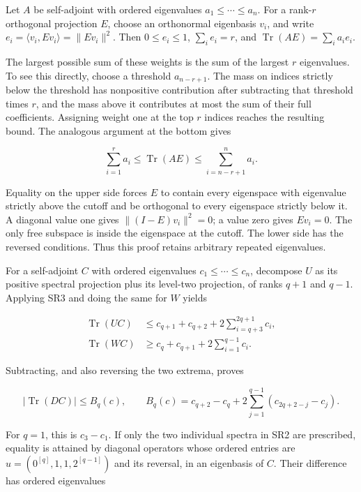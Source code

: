 Let \(A\) be self-adjoint with ordered eigenvalues \(a_1\le\cdots\le a_n\). For a rank-\(r\) orthogonal projection \(E\), choose an orthonormal eigenbasis \(v_i\), and write \(e_i=\langle v_i,Ev_i\rangle=\|Ev_i\|^2\). Then \(0\le e_i\le1\), \(\sum_i e_i=r\), and \(\operatorname{Tr}(AE)=\sum_i a_ie_i\).

The largest possible sum of these weights is the sum of the largest \(r\) eigenvalues. To see this directly, choose a threshold \(a_{n-r+1}\). The mass on indices strictly below the threshold has nonpositive contribution after subtracting that threshold times \(r\), and the mass above it contributes at most the sum of their full coefficients. Assigning weight one at the top \(r\) indices reaches the resulting bound. The analogous argument at the bottom gives

\[
\sum_{i=1}^{r}a_i\le\operatorname{Tr}(AE)
\le\sum_{i=n-r+1}^{n}a_i.
\tag{SR3}
\]

Equality on the upper side forces \(E\) to contain every eigenspace with eigenvalue strictly above the cutoff and be orthogonal to every eigenspace strictly below it. A diagonal value one gives \(\|(I-E)v_i\|^2=0\); a value zero gives \(Ev_i=0\). The only free subspace is inside the eigenspace at the cutoff. The lower side has the reversed conditions. Thus this proof retains arbitrary repeated eigenvalues.

For a self-adjoint \(C\) with ordered eigenvalues \(c_1\le\cdots\le c_n\), decompose \(U\) as its positive spectral projection plus its level-two projection, of ranks \(q+1\) and \(q-1\). Applying SR3 and doing the same for \(W\) yields

\[
\begin{aligned}
\operatorname{Tr}(UC)&\le c_{q+1}+c_{q+2}
+2\sum_{i=q+3}^{2q+1}c_i,\\
\operatorname{Tr}(WC)&\ge c_q+c_{q+1}
+2\sum_{i=1}^{q-1}c_i.
\end{aligned}
\tag{SR4}
\]

Subtracting, and also reversing the two extrema, proves

\[
|\operatorname{Tr}(DC)|\le B_q(c),\qquad
B_q(c)=c_{q+2}-c_q+
2\sum_{j=1}^{q-1}(c_{2q+2-j}-c_j).
\tag{SR5}
\]

For \(q=1\), this is \(c_3-c_1\). If only the two individual spectra in SR2 are prescribed, equality is attained by diagonal operators whose ordered entries are \(u=(0^{[q]},1,1,2^{[q-1]})\) and its reversal, in an eigenbasis of \(C\). Their difference has ordered eigenvalues

